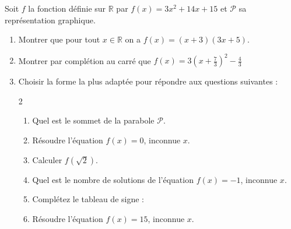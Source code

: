 \documentclass[main.tex]{subfiles}
\begin{document}
\begin{exercise} Soit $f$ la fonction définie sur $\mathbb{R}$ par $f(x) =3x^2+14x+15$ et $\mathscr{P}$ sa représentation graphique.
	\begin{enumerate}[leftmargin=*,label=\arabic*)]
		\item Montrer que pour tout $x\in\mathbb{R}$ on a $f(x)=(x+3)(3x+5)$.
		\item Montrer par complétion au carré que $f(x)=3\left(x+\frac{7}{3} \right)^2 -\frac{4}{3} $
		\item Choisir la forme la plus adaptée pour répondre aux questions suivantes :
		\vspace{-1em}
\begin{multicols}{2}
	\begin{enumerate}[leftmargin=*,label=\alph*)]
			\item Quel est le sommet de la parabole  $\mathscr{P}$.
			\item Résoudre l'équation $f(x)=0$, inconnue $x$.
			\item Calculer $f(\sqrt{2})$.
			\item Quel est le nombre de solutions de l'équation $f(x)=-1$, inconnue $x$.
			\item Complétez le tableau de signe :\\
			\item Résoudre l'équation $f(x)=15$, inconnue $x$.
		\end{enumerate} 
	\end{multicols}
	\end{enumerate} 
\end{exercise}
\end{document}

